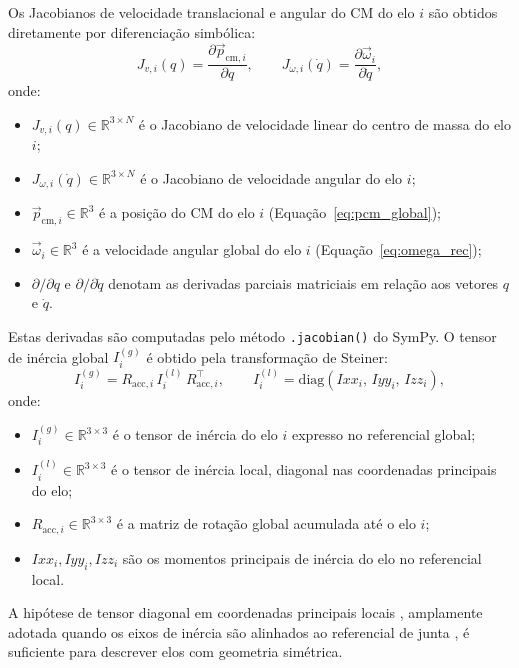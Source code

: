 Os Jacobianos de velocidade translacional e angular do CM do elo $i$ são obtidos diretamente por diferenciação simbólica:
\begin{equation}
    J_{v,i}(q) = \frac{\partial \vec{p}_{\text{cm},i}}{\partial q}, \qquad
    J_{\omega,i}(\dot{q}) = \frac{\partial \vec{\omega}_i}{\partial \dot{q}},
    \label{eq:jacobs}
\end{equation}
onde:
\begin{itemize}
    \item $J_{v,i}(q) \in \mathbb{R}^{3\times N}$ é o Jacobiano de velocidade linear do centro de massa do elo $i$;
    \item $J_{\omega,i}(\dot{q}) \in \mathbb{R}^{3\times N}$ é o Jacobiano de velocidade angular do elo $i$;
    \item $\vec{p}_{\text{cm},i} \in \mathbb{R}^{3}$ é a posição do CM do elo $i$ (Equação~\eqref{eq:pcm_global});
    \item $\vec{\omega}_i \in \mathbb{R}^{3}$ é a velocidade angular global do elo $i$ (Equação~\eqref{eq:omega_rec});
    \item $\partial/\partial q$ e $\partial/\partial \dot{q}$ denotam as derivadas parciais matriciais em relação aos vetores $q$ e $\dot{q}$.
\end{itemize}

Estas derivadas são computadas pelo método \texttt{.jacobian()} do SymPy. O tensor de inércia global $I_i^{(g)}$ é obtido pela transformação de Steiner:
\begin{equation}
    I_i^{(g)} = R_{\text{acc},i}\, I_i^{(l)}\, R_{\text{acc},i}^\top, \qquad
    I_i^{(l)} = \text{diag}(Ixx_i,\, Iyy_i,\, Izz_i),
    \label{eq:I_global}
\end{equation}
onde:
\begin{itemize}
    \item $I_i^{(g)} \in \mathbb{R}^{3\times 3}$ é o tensor de inércia do elo $i$ expresso no referencial global;
    \item $I_i^{(l)} \in \mathbb{R}^{3\times 3}$ é o tensor de inércia local, diagonal nas coordenadas principais do elo;
    \item $R_{\text{acc},i} \in \mathbb{R}^{3\times 3}$ é a matriz de rotação global acumulada até o elo $i$;
    \item $Ixx_i, Iyy_i, Izz_i$ são os momentos principais de inércia do elo no referencial local.
\end{itemize}
A hipótese de tensor diagonal em coordenadas principais locais , amplamente adotada quando os eixos de inércia são alinhados ao referencial de junta \cite{spong2020robot, siciliano2009robotics} , é suficiente para descrever elos com geometria simétrica.

